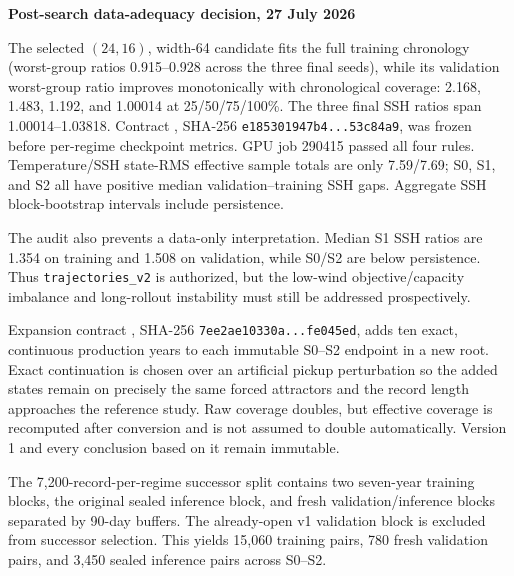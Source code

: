 \documentclass[11pt]{article}
\newenvironment{examplebox}[1]
  {\begin{center}\begin{lrbox}{\examplestore}\begin{minipage}{0.92\textwidth}%
   \textbf{#1}\par\smallskip}
  {\end{minipage}\end{lrbox}\setlength{\fboxsep}{8pt}%
   \fcolorbox{blue}{lightblue}{\usebox{\examplestore}}\end{center}}
\begin{document}
\begin{examplebox}{Post-search data-adequacy decision, 27 July 2026}
The selected \((24,16)\), width-64 candidate fits the full training chronology
(worst-group ratios 0.915--0.928 across the three final seeds), while its validation
worst-group ratio improves monotonically with chronological coverage:
2.168, 1.483, 1.192, and 1.00014 at 25/50/75/100\%.  The three final SSH ratios span
1.00014--1.03818.  Contract
, SHA-256
\texttt{e185301947b4...53c84a9}, was frozen before per-regime checkpoint metrics.
GPU job 290415 passed all four rules.  Temperature/SSH state-RMS effective sample totals
are only 7.59/7.69; S0, S1, and S2 all have positive median validation--training SSH
gaps.  Aggregate SSH block-bootstrap intervals include persistence.

The audit also prevents a data-only interpretation.  Median S1 SSH ratios are 1.354 on
training and 1.508 on validation, while S0/S2 are below persistence.  Thus
\texttt{trajectories\_v2} is authorized, but the low-wind objective/capacity imbalance
and long-rollout instability must still be addressed prospectively.
\end{examplebox}

Expansion contract , SHA-256
\texttt{7ee2ae10330a...fe045ed}, adds ten exact, continuous production years to each
immutable S0--S2 endpoint in a new
 root.  Exact continuation is chosen over an artificial pickup
perturbation so the added states remain on precisely the same forced attractors and the
record length approaches the reference study.  Raw coverage doubles, but effective
coverage is recomputed after conversion and is not assumed to double automatically.
Version 1 and every conclusion based on it remain immutable.

The 7,200-record-per-regime successor split contains two seven-year training blocks,
the original sealed inference block, and fresh validation/inference blocks separated by
90-day buffers.  The already-open v1 validation block is excluded from successor
selection.  This yields 15,060 training pairs, 780 fresh validation pairs, and 3,450
sealed inference pairs across S0--S2.
\end{document}
